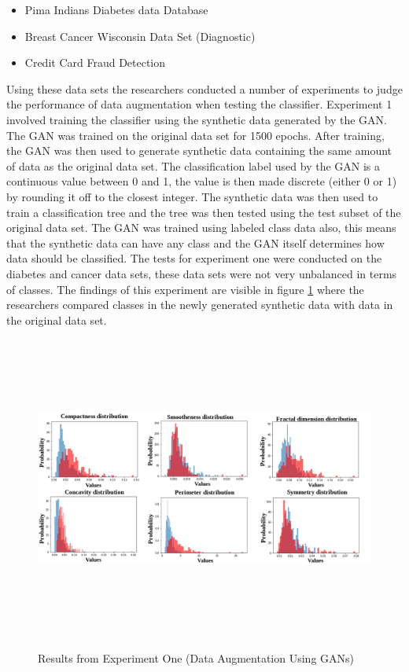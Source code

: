 \begin{itemize}
    \item Pima Indians Diabetes data Database
    \item Breast Cancer Wisconsin Data Set (Diagnostic)
    \item Credit Card Fraud Detection
\end{itemize}
Using these data sets the researchers conducted a number of experiments to judge the performance of data augmentation when testing the classifier.  Experiment 1 involved training the classifier using the synthetic data generated by the GAN.  The GAN was trained on the original data set for 1500 epochs. After training, the GAN was then used to generate synthetic data  containing the same amount of data as the original data set.  The classification label used by the GAN is a continuous value between 0 and 1, the value is then made discrete (either 0 or 1) by rounding it off to the closest integer.  The synthetic data was then used to train a classification tree and the tree was then tested using the test subset of the original data set. The GAN was trained using labeled class data also, this means that the synthetic data can have any class and the GAN itself determines how data should be classified.  The tests for experiment one were conducted on the diabetes and cancer data sets, these data sets were not very unbalanced in terms of classes.  The findings of this experiment are visible in figure \ref{fig:Results from Experiment One(Data Augmentation Using GANs)} where the researchers compared classes in the newly generated synthetic data with data in the original data set.
\vspace{0.5mm}
 \begin{figure}[H]
    \centering
    \includegraphics[width=1\textwidth,height=10cm,keepaspectratio]{Images/Experiment1GanDataAugmentation.png}\\
    \caption{Results from Experiment One (Data Augmentation Using GANs)\cite{litReviewGanDataAugmentation}}
    \label{fig:Results from Experiment One(Data Augmentation Using GANs)}
\end{figure}
